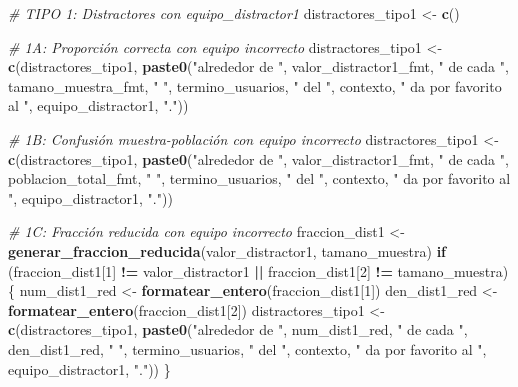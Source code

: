 \documentclass[
]{article}
\newenvironment{Shaded}{\begin{snugshade}}{\end{snugshade}}
\newcommand{\CommentTok}[1]{\textcolor[rgb]{0.56,0.35,0.01}{\textit{#1}}}
\newcommand{\ControlFlowTok}[1]{\textcolor[rgb]{0.13,0.29,0.53}{\textbf{#1}}}
\newcommand{\DecValTok}[1]{\textcolor[rgb]{0.00,0.00,0.81}{#1}}
\newcommand{\FunctionTok}[1]{\textcolor[rgb]{0.13,0.29,0.53}{\textbf{#1}}}
\newcommand{\NormalTok}[1]{#1}
\newcommand{\OtherTok}[1]{\textcolor[rgb]{0.56,0.35,0.01}{#1}}
\newcommand{\SpecialCharTok}[1]{\textcolor[rgb]{0.81,0.36,0.00}{\textbf{#1}}}
\newcommand{\StringTok}[1]{\textcolor[rgb]{0.31,0.60,0.02}{#1}}
\begin{document}
\begin{Shaded}
\begin{Highlighting}[]
\CommentTok{\# TIPO 1: Distractores con equipo\_distractor1}
\NormalTok{distractores\_tipo1 }\OtherTok{\textless{}{-}} \FunctionTok{c}\NormalTok{()}

\CommentTok{\# 1A: Proporción correcta con equipo incorrecto}
\NormalTok{distractores\_tipo1 }\OtherTok{\textless{}{-}} \FunctionTok{c}\NormalTok{(distractores\_tipo1,}
  \FunctionTok{paste0}\NormalTok{(}\StringTok{"alrededor de "}\NormalTok{, valor\_distractor1\_fmt, }\StringTok{" de cada "}\NormalTok{, tamano\_muestra\_fmt, }\StringTok{" "}\NormalTok{,}
\NormalTok{         termino\_usuarios, }\StringTok{" del "}\NormalTok{, contexto, }\StringTok{" da por favorito al "}\NormalTok{, equipo\_distractor1, }\StringTok{"."}\NormalTok{))}

\CommentTok{\# 1B: Confusión muestra{-}población con equipo incorrecto}
\NormalTok{distractores\_tipo1 }\OtherTok{\textless{}{-}} \FunctionTok{c}\NormalTok{(distractores\_tipo1,}
  \FunctionTok{paste0}\NormalTok{(}\StringTok{"alrededor de "}\NormalTok{, valor\_distractor1\_fmt, }\StringTok{" de cada "}\NormalTok{, poblacion\_total\_fmt, }\StringTok{" "}\NormalTok{,}
\NormalTok{         termino\_usuarios, }\StringTok{" del "}\NormalTok{, contexto, }\StringTok{" da por favorito al "}\NormalTok{, equipo\_distractor1, }\StringTok{"."}\NormalTok{))}

\CommentTok{\# 1C: Fracción reducida con equipo incorrecto}
\NormalTok{fraccion\_dist1 }\OtherTok{\textless{}{-}} \FunctionTok{generar\_fraccion\_reducida}\NormalTok{(valor\_distractor1, tamano\_muestra)}
\ControlFlowTok{if}\NormalTok{ (fraccion\_dist1[}\DecValTok{1}\NormalTok{] }\SpecialCharTok{!=}\NormalTok{ valor\_distractor1 }\SpecialCharTok{||}\NormalTok{ fraccion\_dist1[}\DecValTok{2}\NormalTok{] }\SpecialCharTok{!=}\NormalTok{ tamano\_muestra) \{}
\NormalTok{  num\_dist1\_red }\OtherTok{\textless{}{-}} \FunctionTok{formatear\_entero}\NormalTok{(fraccion\_dist1[}\DecValTok{1}\NormalTok{])}
\NormalTok{  den\_dist1\_red }\OtherTok{\textless{}{-}} \FunctionTok{formatear\_entero}\NormalTok{(fraccion\_dist1[}\DecValTok{2}\NormalTok{])}
\NormalTok{  distractores\_tipo1 }\OtherTok{\textless{}{-}} \FunctionTok{c}\NormalTok{(distractores\_tipo1,}
    \FunctionTok{paste0}\NormalTok{(}\StringTok{"alrededor de "}\NormalTok{, num\_dist1\_red, }\StringTok{" de cada "}\NormalTok{, den\_dist1\_red, }\StringTok{" "}\NormalTok{,}
\NormalTok{           termino\_usuarios, }\StringTok{" del "}\NormalTok{, contexto, }\StringTok{" da por favorito al "}\NormalTok{, equipo\_distractor1, }\StringTok{"."}\NormalTok{))}
\NormalTok{\}}


\end{Highlighting}
\end{Shaded}
\end{document}
